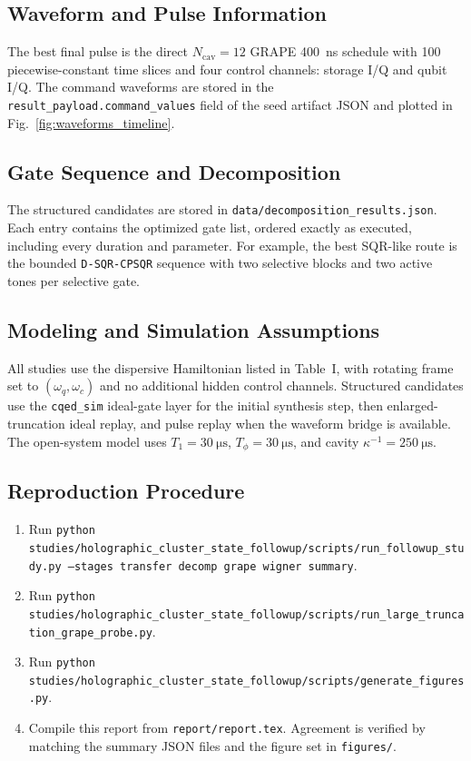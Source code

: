 \documentclass[aps,pra,twocolumn,reprint,amsmath,amssymb]{revtex4-2}
\begin{document}
\subsection{Waveform and Pulse Information}
The best final pulse is the direct $N_{\mathrm{cav}}=12$ GRAPE
\SI{400}{ns} schedule with 100 piecewise-constant time slices and four control
channels: storage I/Q and qubit I/Q. The command waveforms are stored in the
\texttt{result\_payload.command\_values} field of the seed artifact JSON and
plotted in Fig.~\ref{fig:waveforms_timeline}.

\subsection{Gate Sequence and Decomposition}
The structured candidates are stored in
\texttt{data/decomposition\_results.json}. Each entry contains the optimized
gate list, ordered exactly as executed, including every duration and parameter.
For example, the best SQR-like route is the bounded
\texttt{D-SQR-CPSQR} sequence with two selective blocks and two active tones per
selective gate.

\subsection{Modeling and Simulation Assumptions}
All studies use the dispersive Hamiltonian listed in Table~I, with rotating
frame set to $(\omega_q,\omega_c)$ and no additional hidden control channels.
Structured candidates use the \texttt{cqed\_sim} ideal-gate layer for the
initial synthesis step, then enlarged-truncation ideal replay, and pulse replay
when the waveform bridge is available. The open-system model uses
$T_1=\SI{30}{\micro\second}$, $T_\phi=\SI{30}{\micro\second}$, and cavity
$\kappa^{-1}=\SI{250}{\micro\second}$.

\subsection{Reproduction Procedure}
\begin{enumerate}
  \item Run
  \texttt{python studies/holographic\_cluster\_state\_followup/scripts/run\_followup\_study.py --stages transfer decomp grape wigner summary}.
  \item Run
  \texttt{python studies/holographic\_cluster\_state\_followup/scripts/run\_large\_truncation\_grape\_probe.py}.
  \item Run
  \texttt{python studies/holographic\_cluster\_state\_followup/scripts/generate\_figures.py}.
  \item Compile this report from \texttt{report/report.tex}. Agreement is
  verified by matching the summary JSON files and the figure set in
  \texttt{figures/}.
\end{enumerate}
\end{document}

